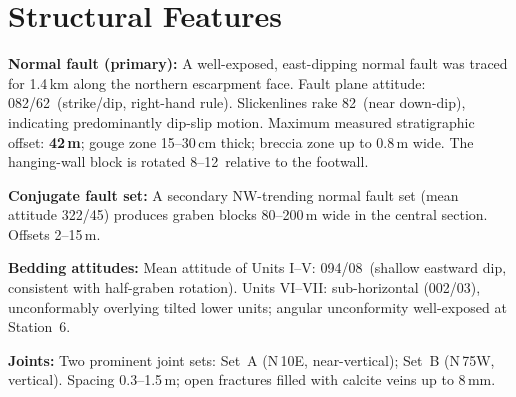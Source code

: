 \section{Structural Features}

\textbf{Normal fault (primary):}
A well-exposed, east-dipping normal fault was traced for 1.4\,km along the
northern escarpment face.
Fault plane attitude: 082\textdegree/62\textdegree\ (strike/dip, right-hand rule).
Slickenlines rake 82\textdegree\ (near down-dip), indicating predominantly dip-slip motion.
Maximum measured stratigraphic offset: \textbf{42\,m}; gouge zone 15--30\,cm thick;
breccia zone up to 0.8\,m wide.
The hanging-wall block is rotated 8--12\textdegree\ relative to the footwall.

\textbf{Conjugate fault set:}
A secondary NW-trending normal fault set (mean attitude 322\textdegree/45\textdegree) produces
graben blocks 80--200\,m wide in the central section. Offsets 2--15\,m.

\textbf{Bedding attitudes:}
Mean attitude of Units I--V: 094\textdegree/08\textdegree\ (shallow eastward dip, consistent with
half-graben rotation). Units VI--VII: sub-horizontal (002\textdegree/03\textdegree), unconformably
overlying tilted lower units; angular unconformity well-exposed at Station~6.

\textbf{Joints:}
Two prominent joint sets: Set~A (N\,10\textdegree{}E, near-vertical); Set~B (N\,75\textdegree{}W, vertical).
Spacing 0.3--1.5\,m; open fractures filled with calcite veins up to 8\,mm.

